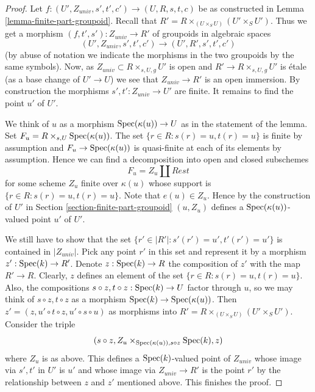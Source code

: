 \begin{proof}
Let $f : (U', Z_{univ}, s', t', c') \to (U, R, s, t, c)$ be as constructed in
Lemma \ref{lemma-finite-part-groupoid}.
Recall that $R' = R \times_{(U \times_S U)} (U' \times_S U')$.
Thus we get a morphism $(f, t', s') : Z_{univ} \to R'$ of groupoids
in algebraic spaces
$$
(U', Z_{univ}, s', t', c') \to (U', R', s', t', c')
$$
(by abuse of notation we indicate the morphisms in the two groupoids
by the same symbols). Now, as $Z_{univ} \subset R \times_{s, U, g} U'$ is open
and $R' \to R \times_{s, U, g} U'$ is \'etale (as a base change
of $U' \to U$) we see that $Z_{univ} \to R'$ is an open immersion.
By construction the morphisms $s', t' : Z_{univ} \to U'$ are finite.
It remains to find the point $u'$ of $U'$.

\medskip\noindent
We think of $u$ as a morphism $\mathop{\mathrm{Spec}}(\kappa(u)) \to U$ as in
the statement of the lemma. Set $F_u = R \times_{s, U} \mathop{\mathrm{Spec}}(\kappa(u))$.
The set $\{r \in R : s(r) = u, t(r) = u\}$ is finite by assumption
and $F_u \to \mathop{\mathrm{Spec}}(\kappa(u))$ is quasi-finite at each
of its elements by assumption. Hence we can find a decomposition into
open and closed subschemes
$$
F_u = Z_u \amalg Rest
$$
for some scheme $Z_u$ finite over $\kappa(u)$ whose support is
$\{r \in R : s(r) = u, t(r) = u\}$. Note that $e(u) \in Z_u$.
Hence by the construction of $U'$ in
Section \ref{section-finite-part-groupoid}
$(u, Z_u)$ defines a $\mathop{\mathrm{Spec}}(\kappa(u))$-valued
point $u'$ of $U'$.

\medskip\noindent
We still have to show that the set
$\{r' \in |R'| : s'(r') = u', t'(r') = u'\}$
is contained in $|Z_{univ}|$.
Pick any point $r'$ in this set and represent it by a morphism
$z' : \mathop{\mathrm{Spec}}(k) \to R'$. Denote $z : \mathop{\mathrm{Spec}}(k) \to R$
the composition of $z'$ with the map $R' \to R$.
Clearly, $z$ defines an element of the set
$\{r \in R : s(r) = u, t(r) = u\}$.
Also, the compositions $s \circ z, t \circ z : \mathop{\mathrm{Spec}}(k) \to U$
factor through $u$, so we may think of $s \circ z, t \circ z$
as a morphism $\mathop{\mathrm{Spec}}(k) \to \mathop{\mathrm{Spec}}(\kappa(u))$. Then
$z' = (z, u' \circ t \circ z, u'\circ s \circ u)$ as morphisms into
$R' = R \times_{(U \times_S U)} (U' \times_S U')$.
Consider the triple
$$
(s \circ z, Z_u \times_{\mathop{\mathrm{Spec}}(\kappa(u)), s \circ z} \mathop{\mathrm{Spec}}(k), z)
$$
where $Z_u$ is as above. This defines a $\mathop{\mathrm{Spec}}(k)$-valued point
of $Z_{univ}$ whose image via $s', t'$ in $U'$ is $u'$ and
whose image via
$Z_{univ} \to R'$ is the point $r'$ by the relationship between
$z$ and $z'$ mentioned above.
This finishes the proof.
\end{proof}

